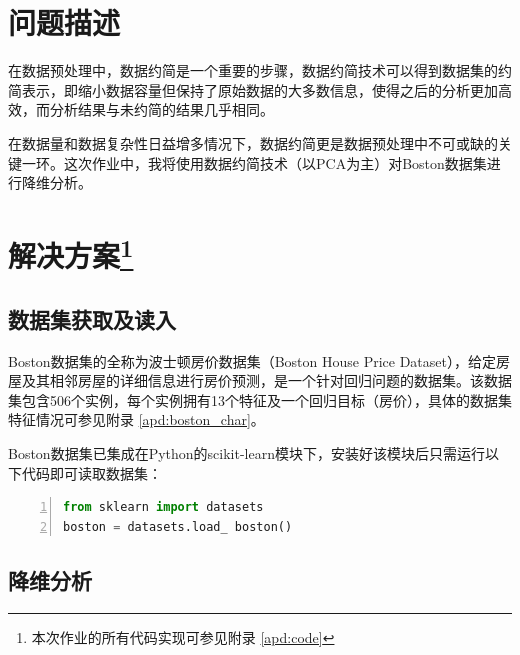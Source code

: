 \documentclass[12pt,a4paper]{article}
\theoremstyle{definition}
\begin{document}
\noindent
\noindent{}

\section{问题描述}

在数据预处理中，数据约简是一个重要的步骤，数据约简技术可以得到数据集的约简表示，即缩小数据容量但保持了原始数据的大多数信息，使得之后的分析更加高效，而分析结果与未约简的结果几乎相同。

在数据量和数据复杂性日益增多情况下，数据约简更是数据预处理中不可或缺的关键一环。这次作业中，我将使用数据约简技术（以PCA为主）对Boston数据集进行降维分析。

\section{解决方案\protect\footnote{本次作业的所有代码实现可参见附录 \ref{apd:code}}}

\subsection{数据集获取及读入}

Boston数据集的全称为波士顿房价数据集（Boston House Price Dataset），给定房屋及其相邻房屋的详细信息进行房价预测，是一个针对回归问题的数据集。该数据集包含506个实例，每个实例拥有13个特征及一个回归目标（房价），具体的数据集特征情况可参见附录 \ref{apd:boston_char}。

Boston数据集已集成在Python的scikit-learn模块下，安装好该模块后只需运行以下代码即可读取数据集：

\vspace{0.01\linewidth}

\begin{lstlisting}[language=Python,
numbers=left,
keywordstyle=\color{blue!70},
frame=shadowbox,
breaklines=True]
from sklearn import datasets
boston = datasets.load_ boston()
\end{lstlisting}

\subsection{降维分析}
\end{document}
